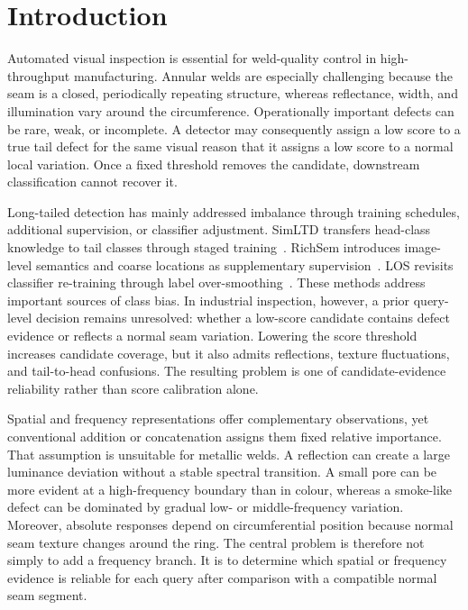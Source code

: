 \section{Introduction}

Automated visual inspection is essential for weld-quality control in high-throughput manufacturing. Annular welds are especially challenging because the seam is a closed, periodically repeating structure, whereas reflectance, width, and illumination vary around the circumference. Operationally important defects can be rare, weak, or incomplete. A detector may consequently assign a low score to a true tail defect for the same visual reason that it assigns a low score to a normal local variation. Once a fixed threshold removes the candidate, downstream classification cannot recover it.

Long-tailed detection has mainly addressed imbalance through training schedules, additional supervision, or classifier adjustment. SimLTD transfers head-class knowledge to tail classes through staged training~\cite{tran2025simltd}. RichSem introduces image-level semantics and coarse locations as supplementary supervision~\cite{meng2023richsem}. LOS revisits classifier re-training through label over-smoothing~\cite{sun2025los}. These methods address important sources of class bias. In industrial inspection, however, a prior query-level decision remains unresolved: whether a low-score candidate contains defect evidence or reflects a normal seam variation. Lowering the score threshold increases candidate coverage, but it also admits reflections, texture fluctuations, and tail-to-head confusions. The resulting problem is one of candidate-evidence reliability rather than score calibration alone.

Spatial and frequency representations offer complementary observations, yet conventional addition or concatenation assigns them fixed relative importance. That assumption is unsuitable for metallic welds. A reflection can create a large luminance deviation without a stable spectral transition. A small pore can be more evident at a high-frequency boundary than in colour, whereas a smoke-like defect can be dominated by gradual low- or middle-frequency variation. Moreover, absolute responses depend on circumferential position because normal seam texture changes around the ring. The central problem is therefore not simply to add a frequency branch. It is to determine which spatial or frequency evidence is reliable for each query after comparison with a compatible normal seam segment.

